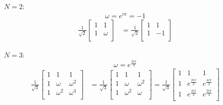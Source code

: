 \documentclass[11pt]{article}
\begin{document}
\begin{itemize}
	\item[$N = 2$:] $$\omega = e^{i \pi} = -1$$
	\begin{align*}
		\frac{1}{\sqrt{2}} \begin{bmatrix}
		1 & 1 \\
		1 & \omega \\
	\end{bmatrix} &= 
	\frac{1}{\sqrt{2}}
	\begin{bmatrix}
		1 & 1 \\
		1 & -1 \\
	\end{bmatrix}
	\end{align*}


\item[$N = 3$:] $$\omega = e^{\frac{2 i \pi}{3}}$$
	\begin{align*}
	\frac{1}{\sqrt{3}} 
		\begin{bmatrix}
		1 & 1 & 1 \\
		1 & \omega & \omega^2 \\
		1 & \omega^2 & \omega^4 \\
		\end{bmatrix} &=
		\frac{1}{\sqrt{3}}
		\begin{bmatrix}
		1 & 1 & 1 \\
		1 & \omega & \omega^2 \\
		1 & \omega^2 & \omega \\
		\end{bmatrix} =
		\frac{1}{\sqrt{3}}
		\begin{bmatrix}
		1 & 1 & 1 \\
		1 & e^{\frac{2 i \pi}{3}} & e^{\frac{4 i \pi}{3}} \\
		1 & e^{\frac{4 i \pi}{3}} & e^{\frac{2 i \pi}{3}} \\
		\end{bmatrix}
	\end{align*}



\end{itemize}
\end{document}
